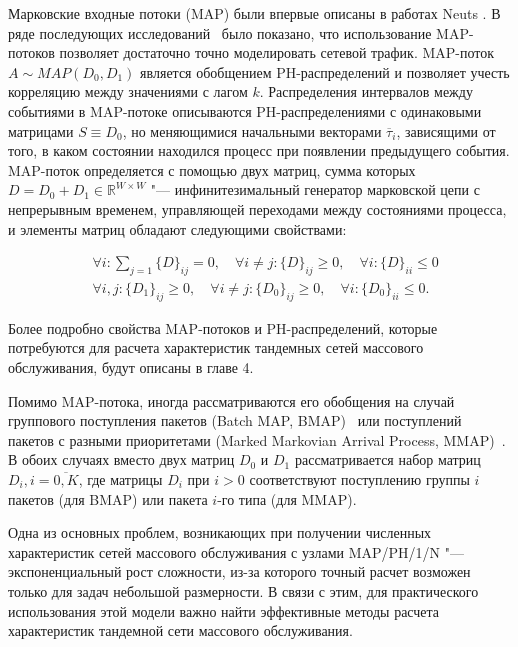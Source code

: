 Марковские входные потоки (MAP) были впервые описаны в работах Neuts \cite{Neuts1979}. В ряде последующих исследований~\cite{Heyman2003, Klemm2003, Scott2003} было показано, что использование MAP-потоков позволяет достаточно точно моделировать сетевой трафик. MAP-поток $A \sim MAP(D_{0},D_{1})$ является обобщением PH-распределений и позволяет учесть корреляцию между значениями с лагом $k$. Распределения интервалов между событиями в MAP-потоке описываются PH-распределениями с одинаковыми матрицами $S \equiv D_0$, но меняющимися начальными векторами $\overline{\tau}_i$, зависящими от того, в каком состоянии находился процесс при появлении предыдущего события. MAP-поток определяется с помощью двух матриц, сумма которых $D=D_{0}+D_{1} \in \mathbb{R}^{W \times W}$ "--- инфинитезимальный генератор марковской цепи с непрерывным временем, управляющей переходами между состояниями процесса, и элементы матриц обладают следующими свойствами:

\begin{equation}\label{eq:ch1_map_def}
    \begin{aligned}
        &\forall i: \sum\limits_{j=1} \{D\}_{ij} = 0, \quad
        \forall i \neq j: \{D\}_{ij} \geq 0, \quad
        \forall i: \{D\}_{ii} \leq 0\\
        &\forall i, j: \{D_{1}\}_{ij} \geq 0,\quad
        \forall i \neq j: \{D_{0}\}_{ij} \geq 0, \quad
        \forall i: \{D_{0}\}_{ii} \leq 0.
    \end{aligned}
\end{equation}

Более подробно свойства MAP-потоков и PH-распределений, которые потребуются для расчета характеристик тандемных сетей массового обслуживания, будут описаны в главе 4.

Помимо MAP-потока, иногда рассматриваются его обобщения на случай группового поступления пакетов (Batch MAP, BMAP)~\cite{Lucantoni1993, Dudin2000, VishnevskyDudin2018} или поступлений пакетов с разными приоритетами (Marked Markovian Arrival Process, MMAP)~\cite{HE2001, VanHoudt2012, Buchholz2010, Klimenok2020}. В обоих случаях вместо двух матриц $D_0$ и $D_1$ рассматривается набор матриц $D_i, i = \overline{0,K}$, где матрицы $D_i$ при $i > 0$ соответствуют поступлению группы $i$ пакетов (для BMAP) или пакета $i$-го типа (для MMAP).

Одна из основных проблем, возникающих при получении численных характеристик сетей массового обслуживания с узлами MAP/PH/1/N "--- экспоненциальный рост сложности, из-за которого точный расчет возможен только для задач небольшой размерности. В связи с этим, для практического использования этой модели важно найти эффективные методы расчета характеристик тандемной сети массового обслуживания.

